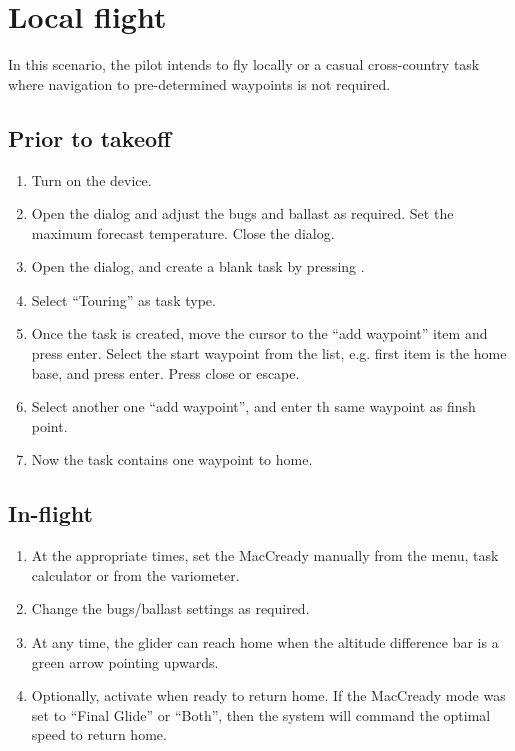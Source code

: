 \documentclass[a4paper,12pt]{refrep}
\begin{document}
\section{Local flight}\label{sec:local-flight}

In this scenario, the pilot intends to fly locally or a casual
cross-country task where navigation to pre-determined waypoints is not
required.

\subsection*{Prior to takeoff}
\begin{enumerate}
\item  Turn on the device.
\item  Open the  dialog and adjust the bugs and ballast as
required. Set the maximum forecast temperature.  Close the dialog.
\item  Open the  dialog, and create a blank task by pressing
.
\item  Select ``Touring'' as  task type.
\item  Once the task is created, move the cursor to the ``add waypoint'' item
and press enter.  Select the start waypoint from the list, e.g. first item is the home base, and press enter.
Press close or escape.
\item Select another one ``add waypoint'', and enter th same waypoint as finsh
point.
\item  Now the task contains one waypoint to home.
\end{enumerate}

\subsection*{In-flight}
\begin{enumerate}
\item  At the appropriate times, set the MacCready manually from the menu,
  task calculator or from the variometer.
\item  Change the bugs/ballast settings as required.
\item  At any time, the glider can reach home when the altitude difference
  bar is a green arrow pointing upwards.
\item  Optionally, activate  when ready to return
home. If the MacCready mode was set to ``Final Glide'' or ``Both'', then the
system will command the optimal speed to return home.
\end{enumerate}
\end{document}
